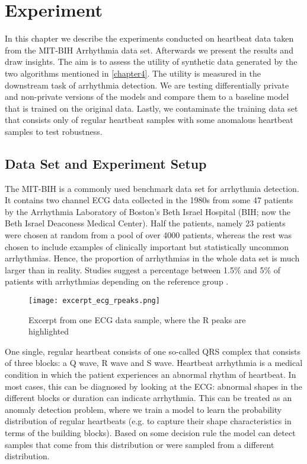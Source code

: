 \section{Experiment}
In this chapter we describe the experiments conducted on heartbeat data taken from the MIT-BIH Arrhythmia data set. Afterwards we present the results and draw insights. The aim is to assess the utility of synthetic data generated by the two algorithms mentioned in \cref{chapter4}. The utility is measured in the downstream task of arrhythmia detection. We are testing differentially private and non-private versions of the models and compare them to a baseline model that is trained on the original data. Lastly, we contaminate the training data set that consists only of regular heartbeat samples with some anomalous heartbeat samples to test robustness.

\subsection{Data Set and Experiment Setup}
The MIT-BIH is a commonly used benchmark data set for arrhythmia detection. It contains two channel ECG data collected in the 1980s from some 47 patients by the Arrhythmia Laboratory of Boston's Beth Israel Hospital (BIH; now the Beth Israel Deaconess Medical Center). Half the patients, namely 23 patients were chosen at random from a pool of over 4000 patients, whereas the rest was chosen to include examples of clinically important but statistically uncommon arrhythmias. Hence, the proportion of arrhythmias in the whole data set is much larger than in reality. Studies suggest a percentage between 1.5\% and 5\% of patients with arrhythmias depending on the reference group \parencite{desai2022arrhythmias}. 

\begin{figure}[h]
    \centering
    \texttt{[image: excerpt\_ecg\_rpeaks.png]}
    \caption{Excerpt from one ECG data sample, where the R peaks are highlighted}
\end{figure}

One single, regular heartbeat consists of one so-called QRS complex that consists of three blocks: a Q wave, R wave and S wave. Heartbeat arrhythmia is a medical condition in which the patient experiences an abnormal rhythm of heartbeat. In most cases, this can be diagnosed by looking at the ECG: abnormal shapes in the different blocks or duration can indicate arrhythmia. This can be treated as an anomaly detection problem, where we train a model to learn the probability distribution of regular heartbeats (e.g. to capture their shape characteristics in terms of the building blocks). Based on some decision rule the model can detect samples that come from this distribution or were sampled from a different distribution.


